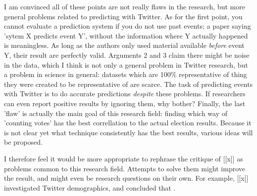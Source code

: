 \documentclass[12pt]{article}
\begin{document}
I am convinced all of these points are not really flaws in the research, but more general problems related to predicting with Twitter. As for the first point, you cannot evaluate a prediction system if you do not use past events; a paper saying 'sytem X predicts event Y', without the information where Y actually happened is meaningless. As long as the authors only used material available \emph{before} event Y, their result are perfectly valid. Arguments 2 and 3 claim there might be noise in the data, which I think is not only a general problem in Twitter research, but a problem in science in general: datasets which are 100\% representative of thing they were created to be representative of are scarce. The task of predicting events with Twitter is to do accurate predictions \emph{despite} these problems. If researchers can even report positive results by ignoring them, why bother? Finally, the last 'flaw' is actually the main goal of this research field: finding which way of 'counting votes' has the best correllation to the actual election results. Because it is not clear yet what technique consistently has the best results, various ideas will be proposed.

I therefore feel it would be more appropriate to rephrase the critique of [[x]] as problems common to this research field. Attempts to solve them might improve the result, and might even be research questions on their own. For example, [[x]] investigated Twitter demographics, and concluded that .
\end{document}
